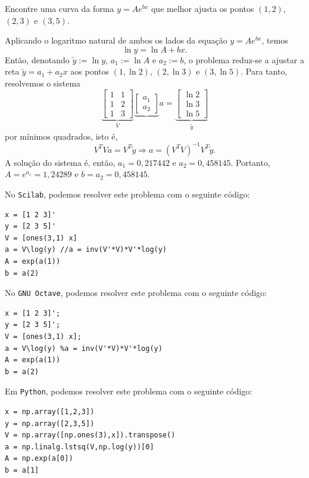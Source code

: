 \begin{ex}Encontre uma curva da forma $y=Ae^{bx}$ que melhor ajusta os pontos $(1, 2)$, $(2, 3)$ e $(3, 5)$.
\end{ex}
\begin{sol}
  Aplicando o logaritmo natural de ambos os lados da equação $y=Ae^{bx}$, temos
\begin{equation}
  \ln y = \ln A + bx.
\end{equation}
Então, denotando $\tilde{y} := \ln y$, $a_1 := \ln A$ e $a_2 := b$, o problema reduz-se a ajustar a reta $\tilde{y} = a_1 + a_2x$ aos pontos $(1, \ln 2)$, $(2, \ln 3)$ e $(3, \ln 5)$. Para tanto, resolvemos o sistema
\begin{equation}
  \underbrace{\begin{bmatrix}
    1 & 1\\
    1 & 2\\
    1 & 3
  \end{bmatrix}}_{V}
  \underbrace{\begin{bmatrix}
    a_1\\
    a_2
  \end{bmatrix}}{a} =
  \underbrace{\begin{bmatrix}
    \ln 2\\
    \ln 3\\
    \ln 5
  \end{bmatrix}}_{\tilde{y}}
\end{equation}
por mínimos quadrados, isto é,
\begin{equation}
 V^TVa = V^T\tilde{y} \Rightarrow a = \left(V^TV\right)^{-1}V^T\tilde{y}.
\end{equation}
A solução do sistema é, então, $a_1=0,217442$ e $a_2=0,458145$. Portanto, $A=e^{a_1}=1,24289$ e $b=a_2=0,458145$.

\ifisscilab
No \verb+Scilab+, podemos resolver este problema com o seguinte código:
\begin{verbatim}
x = [1 2 3]'
y = [2 3 5]'
V = [ones(3,1) x]
a = V\log(y) //a = inv(V'*V)*V'*log(y)
A = exp(a(1))
b = a(2)
\end{verbatim}
\fi
\ifisoctave
No \verb+GNU Octave+, podemos resolver este problema com o seguinte código:
\begin{verbatim}
x = [1 2 3]';
y = [2 3 5]';
V = [ones(3,1) x];
a = V\log(y) %a = inv(V'*V)*V'*log(y)
A = exp(a(1))
b = a(2)
\end{verbatim}
\fi
\ifispython
Em \verb+Python+, podemos resolver este problema com o seguinte código:
\begin{verbatim}
x = np.array([1,2,3])
y = np.array([2,3,5])
V = np.array([np.ones(3),x]).transpose()
a = np.linalg.lstsq(V,np.log(y))[0]
A = np.exp(a[0])
b = a[1]
\end{verbatim}
\fi
\end{sol}

